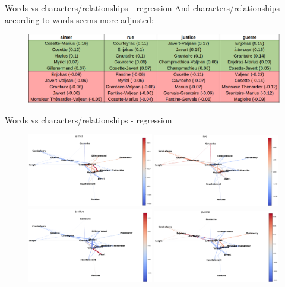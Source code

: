 \documentclass[10pt]{beamer}
\begin{document}
	\begin{frame}{Words vs characters/relationships - regression}
		And characters/relationships according to words seems more adjusted:
		\vspace{-0.2cm}
		\begin{figure}
			\centering
			\includegraphics[width=\textwidth]{img/word_vs_reg.png}
		\end{figure}
	\end{frame}
	
	
	\begin{frame}{Words vs characters/relationships - regression}
		\begin{figure}
			\centering
			\includegraphics[width=0.49\textwidth]{img/aimer_g.png} \includegraphics[width=0.49\textwidth]{img/rue_g.png} \\
			\includegraphics[width=0.49\textwidth]{img/justice_g.png}
			\includegraphics[width=0.49\textwidth]{img/guerre_g.png}
		\end{figure}
	\end{frame}
	
\end{document}
